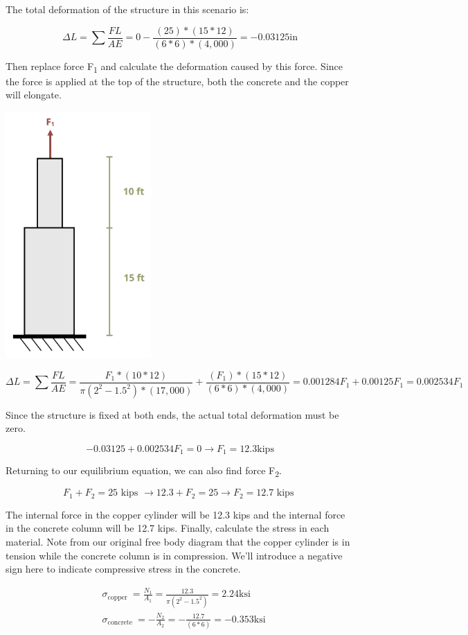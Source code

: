 \documentclass[
  letterpaper,
  DIV=11,
  numbers=noendperiod]{scrreprt}
\begin{document}
\begin{tcolorbox}
\begin{tcolorbox}
The total deformation of the structure in this scenario is:

\[
\Delta L=\sum \frac{F L}{A E}=0-\frac{(25) *(15 * 12)}{(6 * 6) *(4,000)}=-0.03125 \mathrm{in}
\]

Then replace force F\textsubscript{1} and calculate the deformation
caused by this force. Since the force is applied at the top of the
structure, both the concrete and the copper will elongate.

\begin{center}
\includegraphics[width=2.1875in,height=\textheight]{images/PNGs/Example 5.5 part 4.png}
\end{center}

\[
\Delta L=\sum \frac{F L}{A E}=\frac{F_1 *(10 * 12)}{\pi\left(2^2-1.5^2\right) *(17,000)}+\frac{\left(F_1\right) *(15 * 12)}{(6 * 6) *(4,000)}=0.001284 F_1+0.00125 F_1=0.002534 F_1
\]

Since the structure is fixed at both ends, the actual total deformation
must be zero.

\[
-0.03125+0.002534 F_1=0 \rightarrow F_1=12.3 \mathrm{kips}
\]

Returning to our equilibrium equation, we can also find force
F\textsubscript{2}.

\[
F_1+F_2=25 \text { kips } \rightarrow 12.3+F_2=25 \rightarrow F_2=12.7 \text { kips }
\]

The internal force in the copper cylinder will be 12.3 kips and the
internal force in the concrete column will be 12.7 kips. Finally,
calculate the stress in each material. Note from our original free body
diagram that the copper cylinder is in tension while the concrete column
is in compression. We'll introduce a negative sign here to indicate
compressive stress in the concrete.

\[
\begin{aligned}
& \sigma_{\text {copper }}=\frac{N_1}{A_1}=\frac{12.3}{\pi\left(2^2-1.5^2\right)}=2.24 \mathrm{ksi} \\
& \sigma_{\text {concrete }}=-\frac{N_2}{A_2}=-\frac{12.7}{(6 * 6)}=-0.353 \mathrm{ksi}
\end{aligned}
\]

\end{tcolorbox}

\end{tcolorbox}
\end{document}
